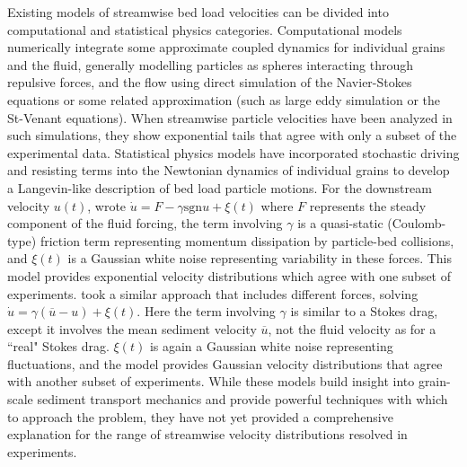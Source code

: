 Existing models of streamwise bed load velocities can be divided into computational and statistical physics categories.
Computational models numerically integrate some approximate coupled dynamics for individual grains and the fluid, generally modelling particles as spheres interacting through repulsive forces, and the flow using direct simulation of the Navier-Stokes equations or some related approximation (such as large eddy simulation or the St-Venant equations). When streamwise particle velocities have been analyzed in such simulations, they show exponential tails \citep{Gonzalez2017,Furbish2013} that agree with only a subset of the experimental data.
Statistical physics models have incorporated stochastic driving and resisting terms into the Newtonian dynamics of individual grains to develop a Langevin-like description of bed load particle motions.
For the downstream velocity $u(t)$, \citet{Fan2014} wrote $\dot{u} = F -\gamma \text{sgn}{u} + \xi(t)$ where $F$ represents the steady component of the fluid forcing, the term involving $\gamma$ is a quasi-static (Coulomb-type) friction term representing momentum dissipation by particle-bed collisions, and $\xi(t)$ is a Gaussian white noise representing variability in these forces. This model provides exponential velocity distributions which agree with one subset of experiments. \citet{Ancey2014} took a similar approach that includes different forces, solving $\dot{u} = \gamma(\overline{u}-u) + \xi(t)$. Here the term involving $\gamma$ is similar to a Stokes drag, except it involves the mean sediment velocity $\overline{u}$, not the fluid velocity as for a ``real" Stokes drag. $\xi(t)$ is again a Gaussian white noise representing fluctuations, and the model provides Gaussian velocity distributions that agree with another subset of experiments. 
While these models build insight into grain-scale sediment transport mechanics and provide powerful techniques with which to approach the problem, they have not yet provided a comprehensive explanation for the range of streamwise velocity distributions resolved in experiments.

